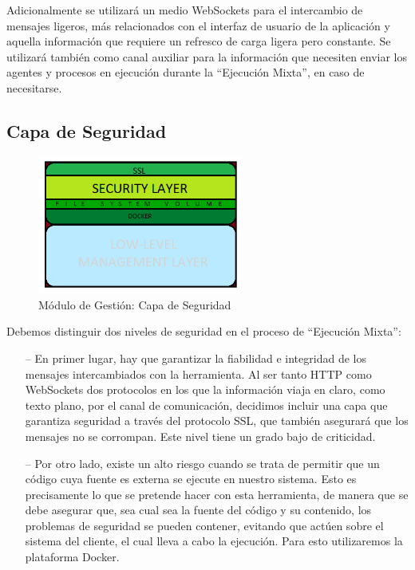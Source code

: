 Adicionalmente se utilizará un medio WebSockets para el intercambio de mensajes ligeros, más relacionados con el interfaz de usuario de la aplicación y aquella información que requiere un refresco de carga ligera pero constante. Se utilizará también como canal auxiliar para la información que necesiten enviar los agentes y procesos en ejecución durante la ``Ejecución Mixta'', en caso de necesitarse.

\subsection{Capa de Seguridad}

\begin{figure}[!hbtp]  \centering\noindent
    \includegraphics[width=0.6\textwidth]{figures/layer2.png}
    \caption{Módulo de Gestión: Capa de Seguridad}
    \label{layer2}
\end{figure}

Debemos distinguir dos niveles de seguridad en el proceso de ``Ejecución Mixta'':

\begin{itemize}
    \item [--] En primer lugar, hay que garantizar la fiabilidad e integridad de los mensajes intercambiados con la herramienta. Al ser tanto HTTP como WebSockets dos protocolos en los que la información viaja en claro, como texto plano, por el canal de comunicación, decidimos incluir una capa que garantiza seguridad a través del protocolo SSL, que también asegurará que los mensajes no se corrompan. Este nivel tiene un grado bajo de criticidad.
    \item [--] Por otro lado, existe un alto riesgo cuando se trata de permitir que un código cuya fuente es externa se ejecute en nuestro sistema. Esto es precisamente lo que se pretende hacer con esta herramienta, de manera que se debe asegurar que, sea cual sea la fuente del código y su contenido, los problemas de seguridad se pueden contener, evitando que actúen sobre el sistema del cliente, el cual lleva a cabo la ejecución. Para esto utilizaremos la plataforma Docker.
\end{itemize}

